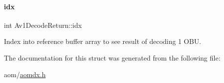 \paragraph{\texorpdfstring{idx}{idx}}
{\footnotesize\ttfamily int Av1\+Decode\+Return\+::idx}

Index into reference buffer array to see result of decoding 1 O\+BU. 

The documentation for this struct was generated from the following file\+:\begin{DoxyCompactItemize}
\item 
aom/\hyperlink{aomdx_8h}{aomdx.\+h}\end{DoxyCompactItemize}
